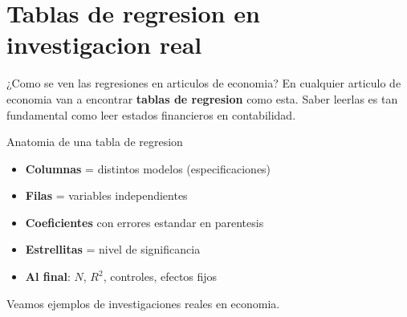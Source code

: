 \documentclass[aspectratio=169, 11pt]{beamer}
\begin{document}
\section{Tablas de regresion en investigacion real}

\begin{frame}{¿Como se ven las regresiones en articulos de economia?}
\small
En cualquier articulo de economia van a encontrar \textbf{tablas de regresion} como esta. Saber leerlas es tan fundamental como leer estados financieros en contabilidad.

\vspace{0.2cm}
\begin{block}{Anatomia de una tabla de regresion}
\begin{itemize}\setlength{\itemsep}{2pt}
  \item \textbf{Columnas} = distintos modelos (especificaciones)
  \item \textbf{Filas} = variables independientes
  \item \textbf{Coeficientes} con errores estandar en parentesis
  \item \textbf{Estrellitas} = nivel de significancia
  \item \textbf{Al final}: $N$, $R^2$, controles, efectos fijos
\end{itemize}
\end{block}

\vspace{0.2cm}
Veamos ejemplos de investigaciones reales en economia.
\end{frame}
\end{document}
